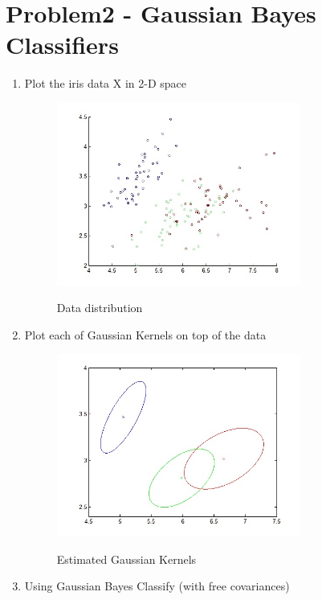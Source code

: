 \documentclass[12pt]{article}
\begin{document}
\section{Problem2 - Gaussian Bayes Classifiers}
\begin{enumerate}
    \item Plot the iris data X in 2-D space
    
    \begin{figure}[H]
      \centering
      \includegraphics[width=8cm]{fig/2-0.jpg}\\
      \caption{Data distribution}\label{fig1}
    \end{figure}
    
    \item Plot each of Gaussian Kernels on top of the data
    
    \begin{figure}[H]
      \centering
      \includegraphics[width=8cm]{fig/2-1.jpg}\\
      \caption{Estimated Gaussian Kernels}\label{fig1}
    \end{figure}

    \item Using Gaussian Bayes Classify (with free covariances)
    

\end{enumerate}
\end{document}
